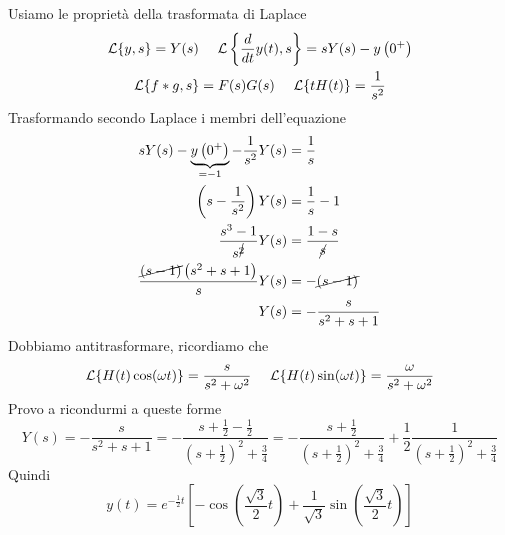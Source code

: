 Usiamo le proprietà della trasformata di Laplace
\begin{gather*}
\mathcal{L}\{y, s\} = Y(s) \ \ \ \ \mathcal{L}\left\{\frac{d}{dt} y(t), s\right\} = sY(s) - y\left(0^{+}\right)\\
\mathcal{L}\{f*g, s\} = F(s) G(s) \ \ \ \ \mathcal{L}\{tH(t)\} = \frac{1}{s^{2}}
\end{gather*}
Trasformando secondo Laplace i membri dell'equazione
\begin{align*}
sY(s) - \underbrace{y\left(0^{+}\right)}_{= -1} - \frac{1}{s^{2}} Y(s) & = \frac{1}{s}\\
\left(s - \frac{1}{s^{2}}\right) Y(s) & = \frac{1}{s} - 1\\
\frac{s^{3} - 1}{s^{\cancel{2}}} Y(s) & = \frac{1 - s}{\cancel{s}}\\
\frac{\cancel{(s - 1)}\left(s^{2} + s + 1\right)}{s} Y(s) & = - \cancel{(s - 1)}\\
Y(s) & = - \frac{s}{s^{2} + s + 1}
\end{align*}
Dobbiamo antitrasformare, ricordiamo che
\begin{equation*}
\mathcal{L}\{H(t)\cos(\omega t)\} = \frac{s}{s^{2} + \omega^{2}} \ \ \ \ \mathcal{L}\{H(t)\sin(\omega t)\} = \frac{\omega}{s^{2} + \omega^{2}}
\end{equation*}
Provo a ricondurmi a queste forme
\begin{equation*}
Y(s) = - \frac{s}{s^{2} + s + 1} = - \frac{s + \frac{1}{2} - \frac{1}{2}}{\left(s + \frac{1}{2}\right)^{2} + \frac{3}{4}} = - \frac{s + \frac{1}{2}}{\left(s + \frac{1}{2}\right)^{2} + \frac{3}{4}} + \frac{1}{2}\frac{1}{\left(s + \frac{1}{2}\right)^{2} + \frac{3}{4}}
\end{equation*}
Quindi
\begin{equation*}
y(t) = e^{- \frac{1}{2} t}\left[ - \cos\left(\frac{\sqrt{3}}{2} t\right) + \frac{1}{\sqrt{3}}\sin\left(\frac{\sqrt{3}}{2} t\right)\right]
\end{equation*}
\Soluzione


